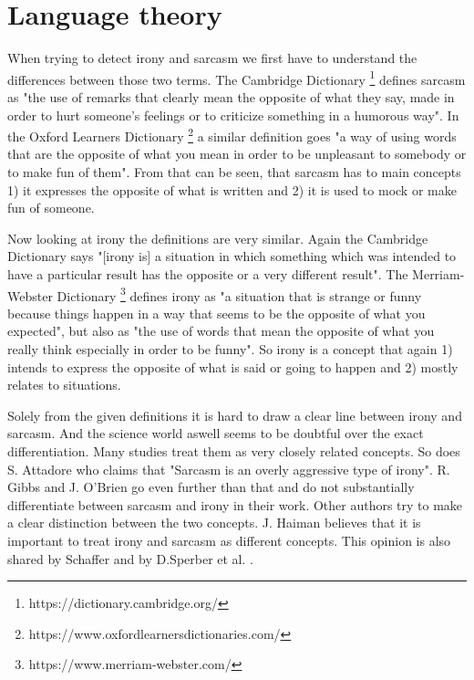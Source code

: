 \documentclass[sigconf,  review=false, nonacm=true]{acmart}
\begin{document}
\section{Language theory}
\label{lang-theo}

When trying to detect irony and sarcasm we first have to understand the differences between those two terms. The Cambridge Dictionary \footnote{https://dictionary.cambridge.org/} defines sarcasm as "the use of remarks that clearly mean the opposite of what they say, made in order to hurt someone's feelings or to criticize something in a humorous way". In the Oxford Learners Dictionary \footnote{https://www.oxfordlearnersdictionaries.com/} a similar definition goes "a way of using words that are the opposite of what you mean in order to be unpleasant to somebody or to make fun of them". From that can be seen, that sarcasm has to main concepts 1) it expresses the opposite of what is written and 2) it is used to mock or make fun of someone.

Now looking at irony the definitions are very similar. Again the Cambridge Dictionary says "[irony is] a situation in which something which was intended to have a particular result has the opposite or a very different result". The Merriam-Webster Dictionary \footnote{https://www.merriam-webster.com/} defines irony as "a situation that is strange or funny because things happen in a way that seems to be the opposite of what you expected", but also as "the use of words that mean the opposite of what you really think especially in order to be funny". So irony is a concept that again 1) intends to express the opposite of what is said or going to happen and 2) mostly relates to situations.

Solely from the given definitions it is hard to draw a clear line between irony and sarcasm. And the science world aswell seems to be doubtful over the exact differentiation. Many studies treat them as very closely related concepts. So does S. Attadore \cite{Irony-as-relevant-inappropriateness} who claims that "Sarcasm is an overly aggressive type of irony". R. Gibbs and J. O'Brien \cite{Psychological_aspects_of_irony_understanding} go even further than that and do not substantially differentiate between sarcasm and irony in their work. Other authors try to make a clear distinction between the two concepts. J. Haiman \cite{Sarcasm-as-theater} believes that it is important to treat irony and sarcasm as different concepts. This opinion is also shared by Schaffer \cite{Vocal-Cues-for-Irony-in-English} and by D.Sperber et al. \cite{Irony-and-the-use-mention-distinction}.
\end{document}
